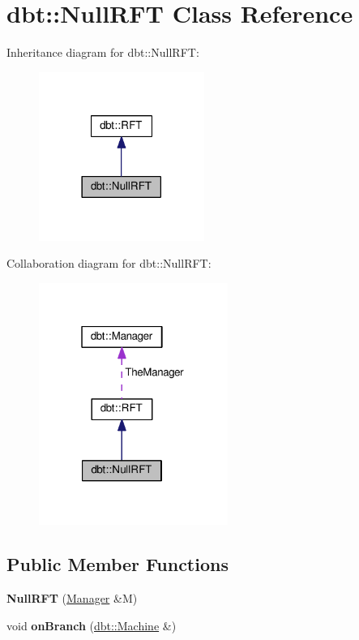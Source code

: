 \hypertarget{classdbt_1_1_null_r_f_t}{}\section{dbt\+:\+:Null\+R\+FT Class Reference}
\label{classdbt_1_1_null_r_f_t}


Inheritance diagram for dbt\+:\+:Null\+R\+FT\+:\nopagebreak
\begin{figure}[H]
\begin{center}
\leavevmode
\includegraphics[width=153pt]{classdbt_1_1_null_r_f_t__inherit__graph}
\end{center}
\end{figure}


Collaboration diagram for dbt\+:\+:Null\+R\+FT\+:\nopagebreak
\begin{figure}[H]
\begin{center}
\leavevmode
\includegraphics[width=175pt]{classdbt_1_1_null_r_f_t__coll__graph}
\end{center}
\end{figure}
\subsection*{Public Member Functions}
\begin{DoxyCompactItemize}
\item 
{\bfseries Null\+R\+FT} (\hyperlink{classdbt_1_1_manager}{Manager} \&M)\hypertarget{classdbt_1_1_null_r_f_t_a9fc2650b0c244e9d68341033c186b85d}{}\label{classdbt_1_1_null_r_f_t_a9fc2650b0c244e9d68341033c186b85d}

\item 
void {\bfseries on\+Branch} (\hyperlink{classdbt_1_1_machine}{dbt\+::\+Machine} \&)\hypertarget{classdbt_1_1_null_r_f_t_ab611ed83cc1c6c35d45f19b99f5f7534}{}\label{classdbt_1_1_null_r_f_t_ab611ed83cc1c6c35d45f19b99f5f7534}

\end{DoxyCompactItemize}

